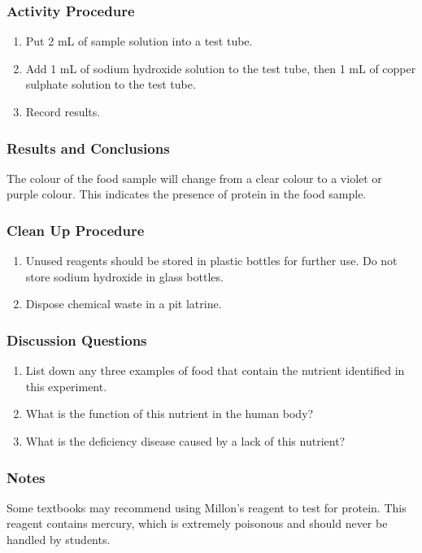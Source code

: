 \subsubsection*{Activity Procedure}
\begin{enumerate}
\item{Put 2 mL of sample solution into a test tube.}
\item{Add 1 mL of sodium hydroxide solution to the test tube, then 1 mL of copper sulphate solution to the test tube.}
\item{Record results.}
\end{enumerate}

\subsubsection*{Results and Conclusions}
The colour of the food sample will change from a clear colour to a violet or purple colour. This indicates the presence of protein in the food sample.

\subsubsection*{Clean Up Procedure}
\begin{enumerate}
\item{Unused reagents should be stored in plastic bottles for further use. Do not store sodium hydroxide in glass bottles.}
\item{Dispose chemical waste in a pit latrine.}
\end{enumerate}

\subsubsection*{Discussion Questions}
\begin{enumerate}
\item{List down any three examples of food that contain the nutrient identified in this experiment.}
\item{What is the function of this nutrient in the human body?}
\item{What is the deficiency disease caused by a lack of this nutrient?}
\end{enumerate}

\subsubsection*{Notes}
Some textbooks may recommend using Millon's reagent to test for protein. This reagent contains mercury, which is extremely poisonous and should never be handled by students.

